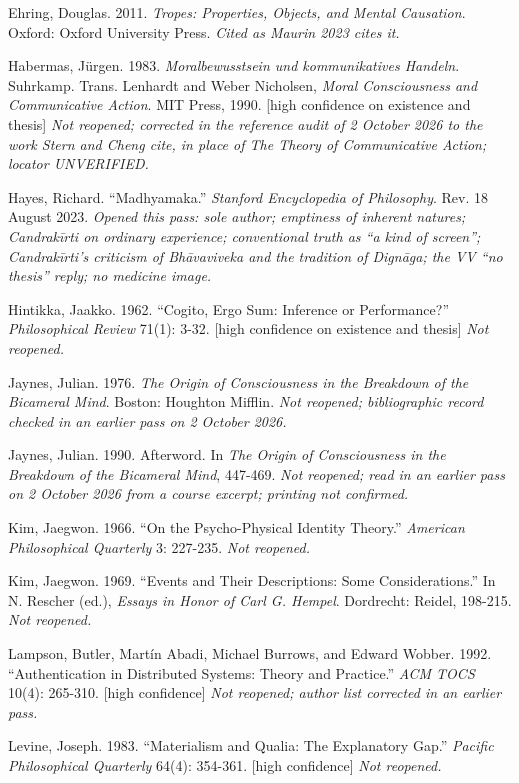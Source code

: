 \documentclass[11pt]{article}
\begin{document}
Ehring, Douglas. 2011. \emph{Tropes: Properties, Objects, and Mental Causation}. Oxford: Oxford University Press. \emph{Cited as Maurin 2023 cites it.}

Habermas, Jürgen. 1983. \emph{Moralbewusstsein und kommunikatives Handeln}. Suhrkamp. Trans. Lenhardt and Weber Nicholsen, \emph{Moral Consciousness and Communicative Action}. MIT Press, 1990. [high confidence on existence and thesis] \emph{Not reopened; corrected in the reference audit of 2 October 2026 to the work Stern and Cheng cite, in place of The Theory of Communicative Action; locator UNVERIFIED.}

Hayes, Richard. ``Madhyamaka.'' \emph{Stanford Encyclopedia of Philosophy}. Rev. 18 August 2023. \emph{Opened this pass: sole author; emptiness of inherent natures; Candrakīrti on ordinary experience; conventional truth as ``a kind of screen''; Candrakīrti's criticism of Bhāvaviveka and the tradition of Dignāga; the VV ``no thesis'' reply; no medicine image.}

Hintikka, Jaakko. 1962. ``Cogito, Ergo Sum: Inference or Performance?'' \emph{Philosophical Review} 71(1): 3-32. [high confidence on existence and thesis] \emph{Not reopened.}

Jaynes, Julian. 1976. \emph{The Origin of Consciousness in the Breakdown of the Bicameral Mind}. Boston: Houghton Mifflin. \emph{Not reopened; bibliographic record checked in an earlier pass on 2 October 2026.}

Jaynes, Julian. 1990. Afterword. In \emph{The Origin of Consciousness in the Breakdown of the Bicameral Mind}, 447-469. \emph{Not reopened; read in an earlier pass on 2 October 2026 from a course excerpt; printing not confirmed.}

Kim, Jaegwon. 1966. ``On the Psycho-Physical Identity Theory.'' \emph{American Philosophical Quarterly} 3: 227-235. \emph{Not reopened.}

Kim, Jaegwon. 1969. ``Events and Their Descriptions: Some Considerations.'' In N. Rescher (ed.), \emph{Essays in Honor of Carl G. Hempel}. Dordrecht: Reidel, 198-215. \emph{Not reopened.}

Lampson, Butler, Martín Abadi, Michael Burrows, and Edward Wobber. 1992. ``Authentication in Distributed Systems: Theory and Practice.'' \emph{ACM TOCS} 10(4): 265-310. [high confidence] \emph{Not reopened; author list corrected in an earlier pass.}

Levine, Joseph. 1983. ``Materialism and Qualia: The Explanatory Gap.'' \emph{Pacific Philosophical Quarterly} 64(4): 354-361. [high confidence] \emph{Not reopened.}
\end{document}
